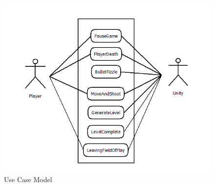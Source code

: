 \documentclass[12pt]{article}       %
\begin{document}
\begin{figure} [H]
\centering
\includegraphics[width=5.5in]{UseCaseModel1.png}
\caption{Use Case Model} \label{Use Case Model}
\end{figure}

\newpage
\end{document}
